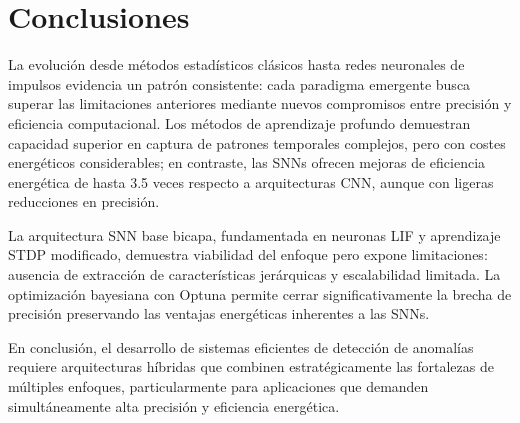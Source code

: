 \section{Conclusiones}

La evolución desde métodos estadísticos clásicos hasta redes neuronales de impulsos evidencia un patrón consistente: cada paradigma emergente busca superar las limitaciones anteriores mediante nuevos compromisos entre precisión y eficiencia computacional. Los métodos de aprendizaje profundo demuestran capacidad superior en captura de patrones temporales complejos, pero con costes energéticos considerables; en contraste, las SNNs ofrecen mejoras de eficiencia energética de hasta 3.5 veces respecto a arquitecturas CNN, aunque con ligeras reducciones en precisión.

La arquitectura SNN base bicapa, fundamentada en neuronas LIF y aprendizaje STDP modificado, demuestra viabilidad del enfoque pero expone limitaciones: ausencia de extracción de características jerárquicas y escalabilidad limitada. La optimización bayesiana con Optuna permite cerrar significativamente la brecha de precisión preservando las ventajas energéticas inherentes a las SNNs.

En conclusión, el desarrollo de sistemas eficientes de detección de anomalías requiere arquitecturas híbridas que combinen estratégicamente las fortalezas de múltiples enfoques, particularmente para aplicaciones que demanden simultáneamente alta precisión y eficiencia energética.